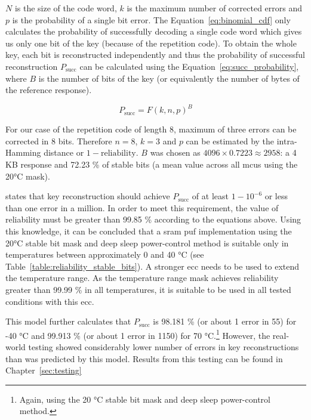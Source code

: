 $N$ is the size of the code word, $k$ is the maximum number of corrected errors and $p$ is the probability of a single bit error. The Equation~\ref{eq:binomial_cdf} only calculates the probability of successfully decoding a single code word which gives us only one bit of the key (because of the repetition code). To obtain the whole key, each bit is reconstructed independently and thus the probability of successful reconstruction $P_{\textrm{succ}}$ can be calculated using the Equation~\ref{eq:succ_probability}, where $B$ is the number of bits of the key (or equivalently the number of bytes of the reference response).

\begin{equation}\label{eq:succ_probability}
    P_{\textrm{succ}} = F(k, n, p)^{B} 
\end{equation}

For our case of the repetition code of length 8, maximum of three errors can be corrected in 8 bits. Therefore $n = 8$, $k = 3$ and $p$ can be estimated by the intra-Hamming distance or $1 - \textrm{reliability}$.\cite{Iluminada2015} $B$ was chosen as $4096 \times 0.7223 \approx 2958$: a 4 KB response and 72.23 \% of stable bits (a mean value across all \glspl{mcu} using the 20°C mask).

\cite{Christoph2008} states that key reconstruction should achieve $P_{\textrm{succ}}$ of at least $1 - 10^{-6}$ or less than one error in a million. In order to meet this requirement, the value of reliability must be greater than 99.85 \% according to the equations above. Using this knowledge, it can be concluded that a \gls{sram} \gls{puf} implementation using the 20°C stable bit mask and deep sleep power-control method is suitable only in temperatures between approximately 0 and 40 °C (see Table~\ref{table:reliability_stable_bits}). A stronger \gls{ecc} needs to be used to extend the temperature range. As the temperature range mask achieves reliability greater than 99.99 \% in all temperatures, it is suitable to be used in all tested conditions with this \gls{ecc}.

This model further calculates that $P_{\textrm{succ}}$ is 98.181 \% (or about 1 error in 55) for -40 °C and 99.913 \% (or about 1 error in 1150) for 70 °C.\footnote{Again, using the 20 °C stable bit mask and deep sleep power-control method.} However, the real-world testing showed considerably lower number of errors in key reconstructions than was predicted by this model. Results from this testing can be found in Chapter~\ref{sec:testing}

